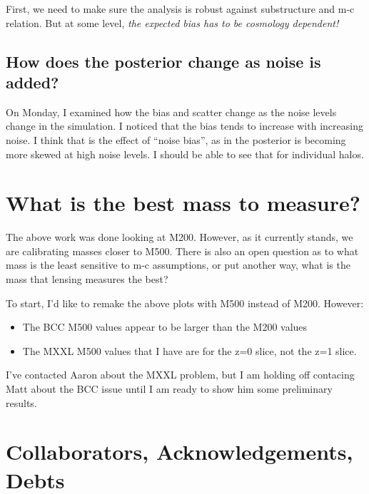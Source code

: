 \documentclass[11pt]{article}
\begin{document}
First, we need to make sure the analysis is robust against substructure and m-c relation. But at some level, \emph{the expected bias has to be cosmology dependent!}


\subsection{How does the posterior change as noise is added?}
\label{sec:noisebias_posteriors}

On Monday, I examined how the bias and scatter change as the noise levels change in the simulation. I noticed that the bias tends to increase with increasing noise. I think that is the effect of ``noise bias'', as in the posterior is becoming more skewed at high noise levels. I should be able to see that for individual halos. 





\section{What is the best mass to measure?}

The above work was done looking at M200. However, as it currently stands, we are calibrating masses closer to M500. There is also an open question as to what mass is the least sensitive to m-c assumptions, or put another way, what is the mass that lensing measures the best?

To start, I'd like to remake the above plots with M500 instead of M200. However:

\begin{itemize}
\item The BCC M500 values appear to be larger than the M200 values
\item The MXXL M500 values that I have are for the z=0 slice, not the z=1 slice.
\end{itemize}

I've contacted Aaron about the MXXL problem, but I am holding off contacing Matt about the BCC issue until I am ready to show him some preliminary results.





\section{Collaborators, Acknowledgements, Debts}
\end{document}
